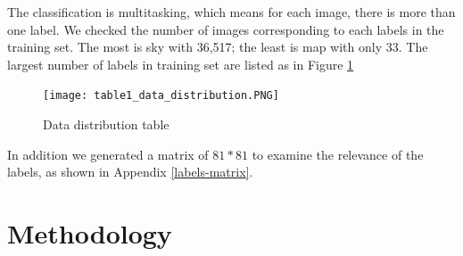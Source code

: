 \documentclass{article}
\begin{document}
The classification is multitasking, which means for each image, there is more than one label. We checked the number of images corresponding to each labels in the training set. The most is sky with 36,517; the least is map with only 33. The largest number of labels in training set are listed as in Figure \ref{Data distribution}

\begin{figure} [H]
    \centering
    \texttt{[image: table1\_data\_distribution.PNG]}
    \caption{Data distribution table}
    \label{Data distribution}
\end{figure}

In addition we generated a matrix of $81*81$ to examine the relevance of the labels, as shown in Appendix \ref{labels-matrix}. 

\section{Methodology}


\end{document}
